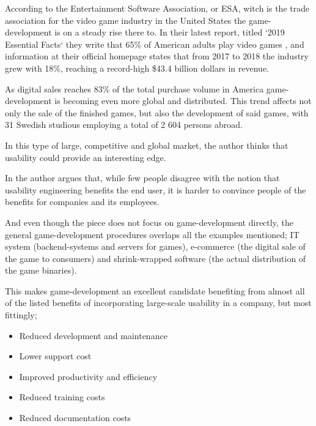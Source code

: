   According to the Entertainment Software Association, or ESA, witch is the trade
  association for the video game industry in the United States the game-development
  is on a steady rise there to. In their latest report, titled `2019 Essential Facts`%
  \cite{cite2019EssentialFactsAbouttheComputerandVideoGameIndustryEntertainmentSoftwareAssociation}
  they write that 65\% of American adults play video
  games\cite[p. 4]{cite2019EssentialFactsAbouttheComputerandVideoGameIndustryEntertainmentSoftwareAssociation}
  , and information at their official homepage states that from 2017 to 2018
  the industry grew with 18\%, reaching a record-high \$43.4 billion dollars in
  revenue\cite{eseaEconomicGrowth}.

  As digital sales reaches 83\% of the total purchase volume in America%
  \cite[p. 20]{cite2019EssentialFactsAbouttheComputerandVideoGameIndustryEntertainmentSoftwareAssociation}
  game-development is becoming even more global and distributed. This trend affects
  not only the sale of the finished games, but also the development of said
  games, with 31 Swedish studious employing a total of 2 604 persons
  abroad\cite[p. 27]{citeIndex2019}.

  In this type of large, competitive and global market, the author thinks that
  usability could provide an interesting edge.

  In \cite{citeBottomLine} the author
  \citeauthor{citeBottomLine} argues that, while few people disagree with
  the notion that usability engineering benefits the end user, it is harder to
  convince people of the benefits for companies and its employees.

  And even though the piece does not focus on game-development directly, the
  general game-development procedures overlaps all the examples
  mentioned; IT system (backend-systems and servers for games), e-commerce (the
  digital sale of the game to consumers) and shrink-wrapped software (the actual
  distribution of the game binaries).

  This makes game-development an excellent candidate benefiting from almost all
  of the listed benefits of incorporating large-scale usability in a company,
  but most fittingly;
  \begin{itemize}
    \item{Reduced development and maintenance}
    \item{Lower support cost}
    \item{Improved productivity and efficiency}
    \item{Reduced training costs}
    \item{Reduced documentation costs}
  \end{itemize}

